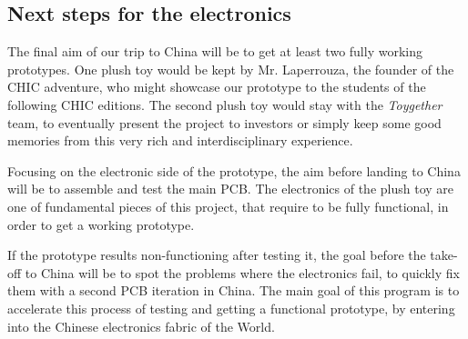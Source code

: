 \newpage
\subsection{Next steps for the electronics}
\label{subsec:electronics_next_steps} 

The final aim of our trip to China will be to get at least two fully working prototypes. One plush toy would be kept by Mr. Laperrouza, the founder of the CHIC adventure, who might showcase our prototype to the students of the following CHIC editions. The second plush toy would stay with the \textit{Toygether} team, to eventually present the project to investors or simply keep some good memories from this very rich and interdisciplinary experience. 

\medskip Focusing on the electronic side of the prototype, the aim before landing to China will be to assemble and test the main PCB. The electronics of the plush toy are one of fundamental pieces of this project, that require to be fully functional, in order to get a working prototype. 

\medskip If the prototype results non-functioning after testing it, the goal before the take-off to China will be to spot the problems where the electronics fail, to quickly fix them with a second PCB iteration in China. The main goal of this program is to accelerate this process of testing and getting a functional prototype, by entering into the Chinese electronics fabric of the World.